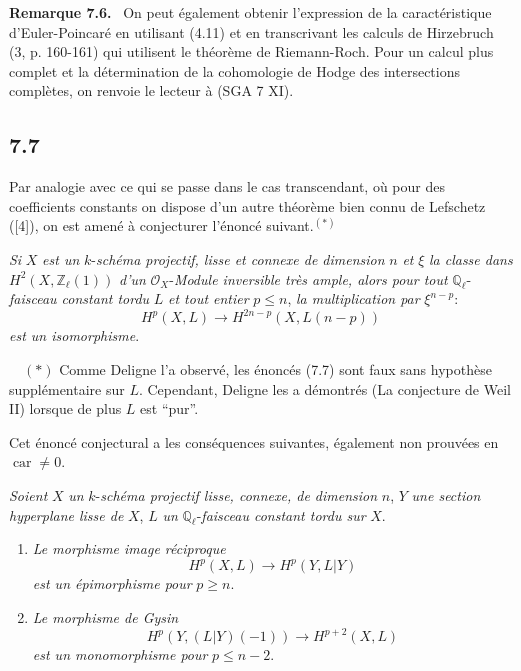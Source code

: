 \documentclass[11pt]{article}
\newenvironment{statement}[1]{\par\medskip\noindent\textbf{#1.}\ }{\par\medskip}
\begin{document}
\begin{statement}{Remarque 7.6}
On peut également obtenir l'expression de la caractéristique d'Euler-Poincaré en utilisant (4.11) et en transcrivant les calculs de Hirzebruch (3, p. 160-161) qui utilisent le théorème de Riemann-Roch. Pour un calcul plus complet et la détermination de la cohomologie de Hodge des intersections complètes, on renvoie le lecteur à (SGA 7 XI).
\end{statement}

\subsection*{7.7}

Par analogie avec ce qui se passe dans le cas transcendant, où pour des coefficients constants on dispose d'un autre théorème bien connu de Lefschetz ([4]), on est amené à conjecturer l'énoncé suivant.$^{(*)}$

 \emph{Si} $X$ \emph{est un} $k$-\emph{schéma projectif, lisse et connexe de dimension} $n$ \emph{et} $\xi$ \emph{la classe dans} $H^2(X,\mathbb Z_\ell(1))$ \emph{d'un} $\mathcal O_X$-\emph{Module inversible très ample, alors pour tout} $\mathbb Q_\ell$-\emph{faisceau constant tordu} $L$ \emph{et tout entier} $p\le n$, \emph{la multiplication par} $\xi^{n-p}$:
\[
H^p(X,L)\to H^{2n-p}(X,L(n-p))
\]
\emph{est un isomorphisme}.

\(\quad (*)\) Comme Deligne l'a observé, les énoncés (7.7) sont faux sans hypothèse supplémentaire sur $L$. Cependant, Deligne les a démontrés (La conjecture de Weil II) lorsque de plus $L$ est ``pur''.

Cet
énoncé conjectural a les conséquences suivantes, également non prouvées en $\operatorname{car}\ne0$.

\emph{Soient} $X$ \emph{un} $k$-\emph{schéma projectif lisse, connexe, de dimension} $n$, $Y$ \emph{une section hyperplane lisse de} $X$, $L$ \emph{un} $\mathbb Q_\ell$-\emph{faisceau constant tordu sur} $X$.
\begin{enumerate}[label=(\roman*)]
\item \emph{Le morphisme image réciproque}
\[
H^p(X,L)\to H^p(Y,L|Y)
\]
\emph{est un épimorphisme pour} $p\ge n$.
\item \emph{Le morphisme de Gysin}
\[
H^p(Y,(L|Y)(-1))\to H^{p+2}(X,L)
\]
\emph{est un monomorphisme pour} $p\le n-2$.
\end{enumerate}
\end{document}
